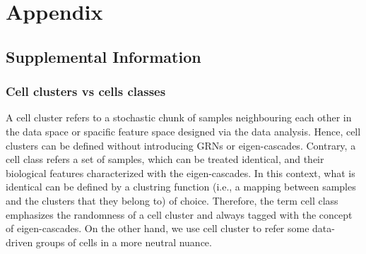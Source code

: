 \documentclass{article}
\title{\empty}
\author{\empty}
\date{\empty}
\begin{document}
\maketitle

\section*{Appendix}
\subsection*{Supplemental Information}
\subsubsection*{Cell clusters vs cells classes}
A cell cluster refers to a stochastic chunk of samples neighbouring each other in the data space or spacific feature 
space designed via the data analysis. Hence, cell clusters can be defined without introducing GRNs or eigen-cascades. 
Contrary, a cell class refers a set of samples, which can be treated identical, and their biological features 
characterized with the eigen-cascades. In this context, what is identical can be defined by a clustring function (i.e., 
a mapping between samples and the clusters that they belong to) of choice. Therefore, the term cell class 
emphasizes the randomness of a cell cluster and always tagged with the concept of eigen-cascades. On the other hand, 
we use cell cluster to refer some data-driven groups of cells in a more neutral nuance.

\newpage
\end{document}
